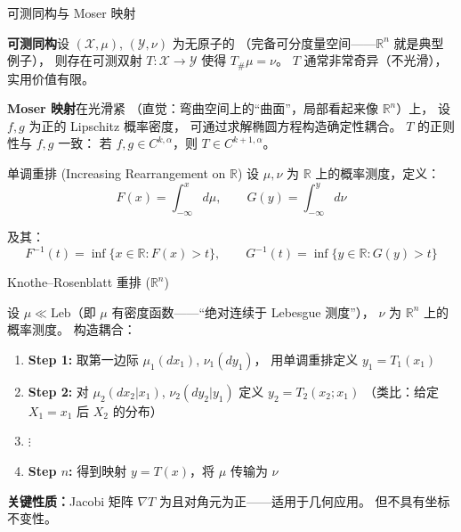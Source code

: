 \documentclass[aspectratio=169,10pt]{beamer}
\begin{document}
\begin{frame}{可测同构与 Moser 映射}
  \begin{TLtext}
    \textbf{可测同构}\enspace 设 $(\mathcal{X},\mu)$, $(\mathcal{Y},\nu)$ 为无原子的
    （完备可分度量空间——$\mathbb{R}^n$ 就是典型例子），
    则存在可测双射 $T\colon\mathcal{X}\to\mathcal{Y}$ 使得 $T_{\#}\mu=\nu$。\enspace
    \textcolor{TLneg}{}\; $T$ 通常非常奇异（不光滑），实用价值有限。

    \medskip
    \textbf{Moser 映射}\enspace 在光滑紧 
    （直觉：弯曲空间上的``曲面''，局部看起来像 $\mathbb{R}^n$）上，
    设 $f,g$ 为正的 Lipschitz 概率密度，
    可通过求解椭圆方程构造确定性耦合。\enspace
    \textcolor{TLpos}{}\; $T$ 的正则性与 $f,g$ 一致：
    若 $f,g\in C^{k,\alpha}$，则 $T\in C^{k+1,\alpha}$。
  \end{TLtext}
\end{frame}

\begin{frame}{单调重排 (Increasing Rearrangement on $\mathbb{R}$)}
  设 $\mu,\nu$ 为 $\mathbb{R}$ 上的概率测度，定义：
  \[
    F(x)=\int_{-\infty}^{x}d\mu,\qquad
    G(y)=\int_{-\infty}^{y}d\nu
  \]

  及其：
  \[
    F^{-1}(t)=\inf\{x\in\mathbb{R} : F(x)>t\},\qquad
    G^{-1}(t)=\inf\{y\in\mathbb{R} : G(y)>t\}
  \]

\end{frame}

\begin{frame}{Knothe–Rosenblatt 重排 ($\mathbb{R}^n$)}
  \begin{TLtext}
    设 $\mu\ll\mathrm{Leb}$\;（即 $\mu$ 有密度函数——``绝对连续于 Lebesgue 测度''），
    $\nu$ 为 $\mathbb{R}^n$ 上的概率测度。
    构造耦合：
  \end{TLtext}

  \vspace{0.3em}
  \begin{enumerate}
    \item \textbf{Step 1:} 取第一边际 $\mu_1(dx_1)$, $\nu_1(dy_1)$，
      用单调重排定义 $y_1=T_1(x_1)$
    \item \textbf{Step 2:} 对
      $\mu_2(dx_2|x_1)$, $\nu_2(dy_2|y_1)$ 定义 $y_2=T_2(x_2;x_1)$
      \;（类比：给定 $X_1=x_1$ 后 $X_2$ 的分布）
    \item[] $\vdots$
    \item[$n$.] \textbf{Step $n$:} 得到映射 $y=T(x)$，将 $\mu$ 传输为 $\nu$
  \end{enumerate}

  \vspace{0.3em}
  \medskip
  \textbf{关键性质：}Jacobi 矩阵 $\nabla T$ 为且对角元为正——适用于几何应用。
  但不具有坐标不变性。
\end{frame}
\end{document}
